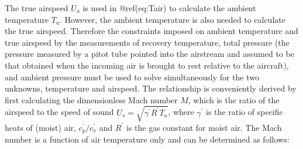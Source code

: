 \documentclass[
  english,
]{book}
\begin{document}
The true airspeed \(U_a\) is used in @ref(eq:Tair) to calculate the
ambient temperature \(T_a\). However, the ambient temperature is also
needed to calculate the true airspeed. Therefore the constraints imposed
on ambient temperature and true airspeed by the measurements of recovery
temperature, total pressure (the pressure measured by a pitot tube
pointed into the airstream and assumed to be that obtained when the
incoming air is brought to rest relative to the aircraft), and ambient
pressure must be used to solve simultaneously for the two unknowns,
temperature and airspeed. The relationship is conveniently derived by
first calculating the dimensionless Mach number \(M\), which is the
ratio of the airspeed to the speed of sound
\(U_{s}=\sqrt{\gamma^{\prime}R^{\prime}T_{a}}\), where \(\gamma^\prime\)
is the ratio of specific heats of (moist) air,
\(c_p^\prime /c_v^\prime\) and \(R^\prime\) is the gas constant for
moist air. The Mach number is a function of air temperature only and can
be determined as follows:
\end{document}
